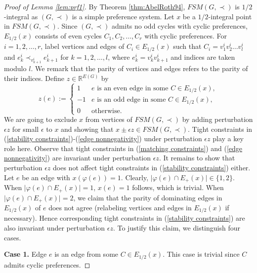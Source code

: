 \documentclass[11pt]{article}
\numberwithin{theorem}{section}
\begin{document}
\begin{proof}[Proof of Lemma \ref{lem:prf1}]
By Theorem \ref{thm:AbelRoth94}, $FSM(G,\prec)$ is $1/2$-integral as $(G,\prec)$ is a simple preference system.
Let $x$ be a $1/2$-integral point in $FSM(G, \prec)$.
Since $(G,\prec)$ admits no odd cycles with cyclic preferences, $E_{1/2}(x)$ consists of even cycles $C_1,C_2,\ldots,C_r$ with cyclic preferences. For $i=1,2,\ldots,r$, label vertices and edges of $C_i\in E_{1/2}(x)$ such that $C_i=v^i_1v^i_2\ldots v^i_{l}$ and $e^i_k\prec_{v^i_{k+1}} e^i_{k+1}$ for $k=1,2,\ldots,l$, where $e^i_k=v^i_{k}v^i_{k+1}$ and indices are taken modulo $l$. 
We remark that the parity of vertices and edges refers to the parity of their indices. Define $z\in \mathbb{R}^{E(G)}$ by
\begin{equation*}
z(e):=
\begin{cases}
1 & e\text{ is an even edge in some }C \in E_{1/2}(x),\\
-1 & e\text{ is an odd edge in some }C \in E_{1/2}(x),\\
0 & \text{otherwise}.
\end{cases}
\end{equation*}
We are going to exclude $x$ from vertices of $FSM(G, \prec)$ by adding perturbation $\epsilon z$ for small $\epsilon$ to $x$ and showing that $x\pm\epsilon z\in FSM(G,\prec)$. 
Tight constraints in (\ref{stability constraints})-(\ref{edge nonnegativity}) under perturbation $\epsilon z$ play a key role here. Observe that tight constraints in (\ref{matching constraints}) and (\ref{edge nonnegativity}) are invariant under perturbation $\epsilon z$. It remains to show that perturbation $\epsilon z$ does not affect tight constraints in (\ref{stability constraints}) either. Let $e$ be an edge with $x(\varphi(e))=1$. Clearly, $\lvert \varphi(e)\cap E_+(x)\rvert \in\{1,2\}$. When $\lvert \varphi(e)\cap E_+(x)\rvert=1$, $x(e)=1$ follows, which is trivial. When $\lvert \varphi(e)\cap E_+(x)\rvert =2$, we claim that the parity of dominating edges in $E_{1/2}(x)$ of $e$ does not agree (relabeling vertices and edges in $E_{1/2}(x)$ if necessary).
Hence corresponding tight constraints in (\ref{stability constraints}) are also invariant under perturbation $\epsilon z$.
To justify this claim, we distinguish four cases.

\textbf{Case 1.} Edge $e$ is an edge from some $C\in E_{1/2}(x)$. This case is trivial since $C$ admits cyclic preferences.


\end{proof}
\end{document}
